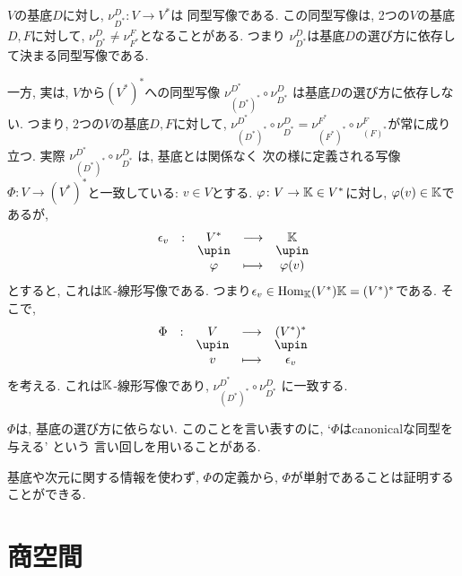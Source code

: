 \begin{remark}
$V$の基底$D$に対し,
$\nu^{D}_{D^\ast}\colon V\to V^\ast$は
同型写像である.
この同型写像は,
2つの$V$の基底$D,F$に対して,
$\nu^{D}_{D^\ast}\neq \nu^{F}_{F^\ast}$となることがある.
つまり
$\nu^{D}_{D^\ast}$は基底$D$の選び方に依存して決まる同型写像である.

一方, 実は,
$V$から$(V^\ast)^\ast$への同型写像
$\nu^{D^\ast}_{(D^\ast)^\ast}\circ\nu^{D}_{D^\ast}$
は基底$D$の選び方に依存しない.
つまり,
2つの$V$の基底$D,F$に対して,
$\nu^{D^\ast}_{(D^\ast)^\ast}\circ\nu^{D}_{D^\ast}=\nu^{F^\ast}_{(F^\ast)^\ast}\circ\nu^{F}_{(F)^\ast}$が常に成り立つ.
実際
$\nu^{D^\ast}_{(D^\ast)^\ast}\circ\nu^{D}_{D^\ast}$
は,
基底とは関係なく
次の様に定義される写像$\Phi\colon V\to (V^\ast)^\ast$と一致している:
$v\in V$とする.
$\varphi\colon V\to\mathbb{K}\in V^\ast$に対し,
$\varphi(v)\in \mathbb{K}$であるが,
\begin{align*}
\shazo{\epsilon_v}{V^\ast}{\KK}
{\varphi}{\varphi(v)}
\end{align*}
とすると, これは$\mathbb{K}$-線形写像である.
つまり$\epsilon_v\in \operatorname{Hom}_{\mathbb{K}}(V^\ast){\mathbb{K}}=(V^\ast)^\ast$である.
そこで,
\begin{align*}
\shazo{\Phi}{V}{(V^\ast)^\ast}
{v}{\epsilon_v}
\end{align*}
を考える.
これは$\mathbb{K}$-線形写像であり,
$\nu^{D^\ast}_{(D^\ast)^\ast}\circ\nu^{D}_{D^\ast}$
に一致する.
\end{remark}
\begin{remark}
$\Phi$は,
基底の選び方に依らない.
このことを言い表すのに,
`$\Phi$はcanonicalな同型を与える'
という
言い回しを用いることがある.

基底や次元に関する情報を使わず,
$\Phi$の定義から,
$\Phi$が単射であることは証明することができる.
\end{remark}



\begin{quiz}
\end{quiz}

\chapter{商空間}
\label{chap:quotient}
